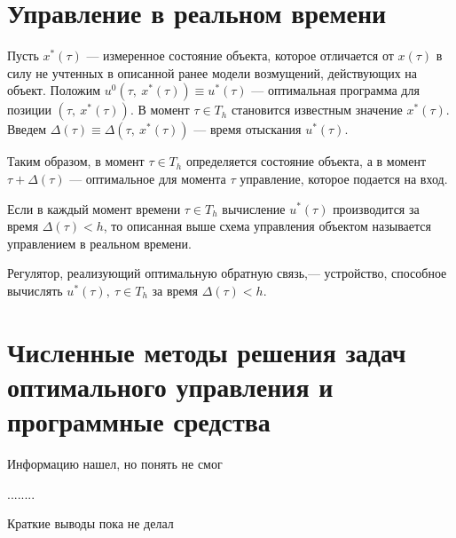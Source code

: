 \section{Управление в реальном времени}\label{1_3}


Пусть $x^*(\tau)$ --- измеренное состояние объекта, которое отличается от $x(\tau)$ в силу не учтенных в описанной ранее модели возмущений, действующих на объект. Положим $u^0(\tau, ~x^*(\tau)) \equiv u^*(\tau)$ --- оптимальная программа для позиции $(\tau, ~x^*(\tau))$. В момент $\tau \in T_h$ становится известным значение $x^*(\tau)$. Введем $\Delta(\tau) \equiv \Delta(\tau, ~x^*(\tau))$ --- время отыскания $u^*(\tau)$.


Таким образом, в момент $\tau \in T_h$ определяется состояние объекта, а в момент $\tau + \Delta(\tau)$ --- оптимальное для момента $\tau$ управление, которое подается на вход.


\begin{definition}  Если в каждый момент времени $\tau \in T_h$ вычисление $u^*(\tau)$ производится за время $\Delta(\tau) < h$, то описанная выше схема управления объектом называется управлением в реальном времени. 
\end{definition}


\begin{definition}   Регулятор, реализующий оптимальную обратную связь,--- устройство, способное вычислять $u^*(\tau),	 ~\tau \in T_h$ за время $\Delta(\tau) < h$.
\end{definition}




\section{Численные методы решения задач оптимального управления и программные средства}


Информацию нашел, но понять не смог


........

\bigskip
Краткие выводы пока не делал 
